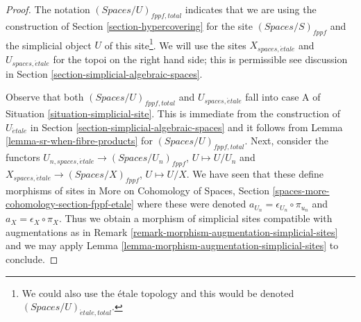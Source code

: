\documentclass{stacks-project}
\theoremstyle{plain}
\theoremstyle{definition}
\theoremstyle{remark}
\numberwithin{equation}{subsection}
\def\etale{{\acute{e}tale}}
\begin{document}
\begin{proof}
The notation $(\textit{Spaces}/U)_{fppf, total}$ indicates that
we are using the construction of
Section \ref{section-hypercovering}
for the site $(\textit{Spaces}/S)_{fppf}$ and the
simplicial object $U$ of this site\footnote{We could also
use the \'etale topology and this would be denoted
$(\textit{Spaces}/U)_{\etale, total}$.}.
We will use the sites $X_{spaces, \etale}$ and $U_{spaces, \etale}$
for the topoi on the right hand side; this is permissible
see discussion in Section \ref{section-simplicial-algebraic-spaces}.

\medskip\noindent
Observe that both $(\textit{Spaces}/U)_{fppf, total}$ and
$U_{spaces, \etale}$
fall into case A of Situation \ref{situation-simplicial-site}.
This is immediate from the construction of
$U_\etale$ in Section \ref{section-simplicial-algebraic-spaces}
and it follows from Lemma \ref{lemma-sr-when-fibre-products}
for $(\textit{Spaces}/U)_{fppf, total}$.
Next, consider the functors
$U_{n, spaces, \etale} \to (\textit{Spaces}/U_n)_{fppf}$, $U \mapsto U/U_n$
and
$X_{spaces, \etale} \to (\textit{Spaces}/X)_{fppf}$, $U \mapsto U/X$.
We have seen that these define morphisms of sites in
More on Cohomology of Spaces, Section
\ref{spaces-more-cohomology-section-fppf-etale}
where these were denoted $a_{U_n} = \epsilon_{U_n} \circ \pi_{u_n}$
and $a_X = \epsilon_X \circ \pi_X$.
Thus we obtain a morphism of simplicial sites compatible with
augmentations as in Remark \ref{remark-morphism-augmentation-simplicial-sites}
and we may apply
Lemma \ref{lemma-morphism-augmentation-simplicial-sites} to conclude.
\end{proof}
\end{document}
